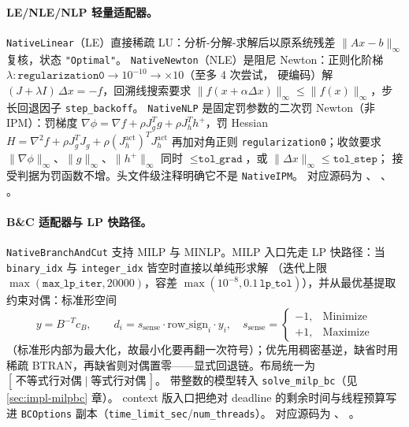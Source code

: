\paragraph{LE/NLE/NLP 轻量适配器。}
\texttt{NativeLinear}（LE）直接稀疏 LU：分析-分解-求解后以原系统残差
$\|Ax-b\|_\infty$ 复核，状态 \texttt{"Optimal"}。
\texttt{NativeNewton}（NLE）是阻尼 Newton：正则化阶梯
$\lambda: \texttt{regularization0}\to 10^{-10}\to \times 10$（至多 4 次尝试，
硬编码）解 $(J+\lambda I)\,\Delta x=-f$，回溯线搜索要求
$\|f(x+\alpha\Delta x)\|_\infty\le\|f(x)\|_\infty$，步长回退因子
\texttt{step\_backoff}。
\texttt{NativeNLP} 是固定罚参数的二次罚 Newton（非 IPM）：罚梯度
$\nabla\phi=\nabla f+\rho J_g^{T}g+\rho J_h^{T}h^{+}$，罚 Hessian
$H=\nabla^2 f+\rho J_g^{T}J_g+\rho (J_h^{\mathrm{act}})^{T}J_h^{\mathrm{act}}$
再加对角正则 \texttt{regularization0}；收敛要求
$\|\nabla\phi\|_\infty$、$\|g\|_\infty$、$\|h^{+}\|_\infty$ 同时
$\le\texttt{tol\_grad}$，或 $\|\Delta x\|_\infty\le\texttt{tol\_step}$；
接受判据为罚函数不增。头文件级注释明确它不是 \texttt{NativeIPM}。
对应源码为
、
、
。

\paragraph{B\&C 适配器与 LP 快路径。}
\texttt{NativeBranchAndCut} 支持 MILP 与 MINLP。MILP 入口先走 LP 快路径：当
\texttt{binary\_idx} 与 \texttt{integer\_idx} 皆空时直接以单纯形求解
（迭代上限 $\max(\texttt{max\_lp\_iter},20000)$，容差
$\max(10^{-8},0.1\,\texttt{lp\_tol})$），并从最优基提取约束对偶：标准形空间
\begin{equation}
  y = B^{-T}c_B,\qquad
  d_i = s_{\mathrm{sense}}\cdot\mathrm{row\_sign}_i\cdot y_i,\quad
  s_{\mathrm{sense}}=\begin{cases}-1,&\text{Minimize}\\+1,&\text{Maximize}\end{cases}
\end{equation}
（标准形内部为最大化，故最小化要再翻一次符号）；优先用稠密基逆，缺省时用
稀疏 BTRAN，再缺省则对偶置零——显式回退链。布局统一为
$[\,\text{不等式行对偶}\;|\;\text{等式行对偶}\,]$。
带整数的模型转入 \texttt{solve\_milp\_bc}（见 \ref{sec:impl-milpbc} 章）。
context 版入口把绝对 deadline 的剩余时间与线程预算写进 \texttt{BCOptions}
副本（\texttt{time\_limit\_sec}/\texttt{num\_threads}）。
对应源码为
、
。

